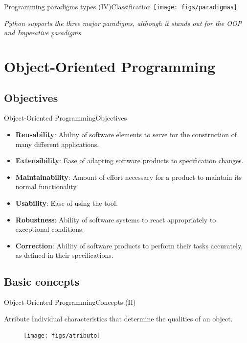 \documentclass[10pt,compress]{beamer} %
\begin{document}
\begin{frame}{Programming paradigms types (IV)}{Classification}
	\texttt{[image: figs/paradigmas]}
	
	\centering\textit{\alert{Python supports the three major paradigms, although it stands out for the OOP and Imperative paradigms.}
}\end{frame}

\section[Object-Oriented Programming]{Object-Oriented Programming}

\subsection{Objectives}

\begin{frame}{Object-Oriented Programming}{Objectives}
\begin{itemize}
  	\item \textbf{Reusability}: Ability of software elements to serve for the construction of many different applications.
  	\item \textbf{Extensibility}: Ease of adapting software products to specification changes.
  	\item \textbf{Maintainability}: Amount of effort necessary for a product to maintain its normal functionality.   
  	\item \textbf{Usability}: Ease of using the tool.
  	\item \textbf{Robustness}: Ability of software systems to react appropriately to exceptional conditions.   
  	\item \textbf{Correction}: Ability of software products to perform their tasks accurately, as defined in their specifications.
  	\end{itemize} 	
\end{frame}

\subsection{Basic concepts}

\begin{frame}{Object-Oriented Programming}{Concepts (II)}
	\vfill\begin{block}{Atribute}
		Individual characteristics that determine the qualities of an object. 
  	\end{block}	
		\begin{figure}
			\texttt{[image: figs/atributo]}
		\end{figure}				
\end{frame}
\end{document}
